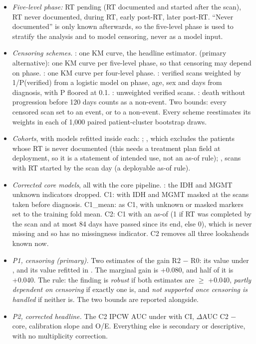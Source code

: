 \documentclass[11pt,a4paper]{article}
\begin{document}
\begin{itemize}
\item \emph{Five-level phase:} RT pending (RT documented and started after the scan), RT never documented, during
RT, early post-RT, later post-RT. ``Never documented'' is only known afterwards, so the five-level phase is used to
stratify the analysis and to model censoring, never as a model input.
\item \emph{Censoring schemes.} : one KM curve, the headline estimator. 
(primary alternative): one KM curve per five-level phase, so that censoring may depend on phase.
: one KM curve per four-level phase. : verified scans weighted by
1/P(verified) from a logistic model on phase, age, sex and days from diagnosis, with P floored at 0.1.
: unweighted verified scans. : death without progression before 120 days
counts as a non-event. Two bounds: every censored scan set to an event, or to a non-event. Every scheme reestimates
its weights in each of 1,000 paired patient-cluster bootstrap draws.
\item \emph{Cohorts}, with models refitted inside each: ; , which excludes the patients
whose RT is never documented (this needs a treatment plan field at deployment, so it is a statement of intended use,
not an as-of rule); , scans with RT started by the scan day (a deployable as-of rule).
\item \emph{Corrected core models}, all with the core pipeline. : the IDH and MGMT unknown
indicators dropped. C1:  with IDH and MGMT masked at the scans taken before diagnosis. C1\_mean:
as C1, with unknown or masked markers set to the training fold mean. C2: C1 with an as-of  (1 if
RT was completed by the scan and at most 84 days have passed since its end, else 0), which is never missing and so
has no missingness indicator. C2 removes all three lookaheads known now.
\item \emph{P1, censoring (primary).} Two estimates of the gain R2 $-$ R0: its value under , and its
value refitted in . The marginal gain is +0.080, and half of it is +0.040. The rule: the finding is
\emph{robust} if both estimates are $\geq$ +0.040, \emph{partly dependent on censoring} if exactly one is, and
\emph{not supported once censoring is handled} if neither is. The two bounds are reported alongside.
\item \emph{P2, corrected headline.} The C2 IPCW AUC under  with CI, $\Delta$AUC C2 $-$ core,
calibration slope and O/E. Everything else is secondary or descriptive, with no multiplicity correction.
\end{itemize}
\end{document}
